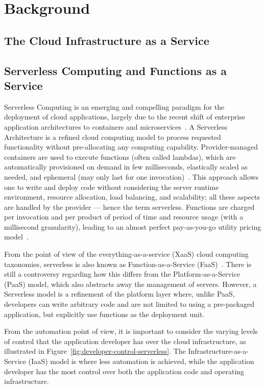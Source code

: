\section{Background}\label{sec:background}

\subsection{The Cloud Infrastructure as a Service}


\subsection{Serverless Computing and Functions as a Service}

Serverless Computing is an emerging and compelling paradigm for the deployment of cloud applications, largely due to the recent shift of enterprise application architectures to containers and microservices~\cite{baldini2017serverless}.  A Serverless Architecture is a refined cloud computing model to process requested functionality without pre-allocating any computing capability. Provider-managed containers are used to execute functions (often called lambdas), which are automatically provisioned on demand in few milliseconds, elastically scaled as needed, and ephemeral (may only last for one invocation)~\cite{Roberts2016serverless}. This approach allows one to write and deploy code without considering the server runtime
environment, resource allocation, load balancing, and scalability; all these aspects are handled by the provider --- hence the term serverless. Functions are charged per invocation and per product of period of time and resource usage (with a millisecond granularity), leading to an almost perfect pay-as-you-go utility pricing model~\cite{3 MateosFaas}. 

From the point of view of the everything-as-a-service (XaaS) cloud computing taxonomies, serverless is also known as Function-as-a-Service (FaaS)~\cite{2 MateosFaas}. There is still a controversy regarding how this differs from the Platform-as-a-Service (PaaS) model, which also abstracts away the management of servers. However, a Serverless model is a refinement of the platform layer where, unlike PaaS, developers can write arbitrary code and are not limited to using a pre-packaged application, but explicitly use functions as the deployment unit.

From the automation point of view, it is important to consider the varying levels of control that the application developer has over the cloud infrastructure, as illustrated in Figure~\ref{fig:developer-control-serverless}. 
The Infrastructure-as-a-Service (IaaS) model is where less automation is achieved, while the application developer has the most control over both the application code and operating infrastructure.

